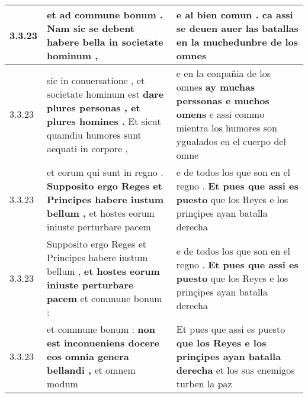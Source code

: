 \begin{tabular}{|p{1cm}|p{6.5cm}|p{6.5cm}|}
3.3.23 & et ad commune bonum . \textbf{ Nam sic se debent habere bella } in societate hominum , & e al bien comun . \textbf{ ca assi se deuen auer las batallas } en la muchedunbre de los omnes \\\hline
3.3.23 & sic in conuersatione , et societate hominum est \textbf{ dare plures personas , et plures homines . } Et sicut quamdiu humores sunt aequati in corpore , & e en la conpañia de los omnes \textbf{ ay muchas perssonas e muchos omens } e assi commo mientra los humores son ygualados en el cuerpo del omne \\\hline
3.3.23 & et eorum qui sunt in regno . \textbf{ Supposito ergo Reges et Principes habere iustum bellum , } et hostes eorum iniuste perturbare pacem & e de todos los que son en el regno . \textbf{ Et pues que assi es puesto } que los Reyes e los prinçipes ayan batalla derecha \\\hline
3.3.23 & Supposito ergo Reges et Principes habere iustum bellum , \textbf{ et hostes eorum iniuste perturbare pacem } et commune bonum : & e de todos los que son en el regno . \textbf{ Et pues que assi es puesto } que los Reyes e los prinçipes ayan batalla derecha \\\hline
3.3.23 & et commune bonum : \textbf{ non est inconueniens docere eos omnia genera bellandi , } et omnem modum & Et pues que assi es puesto \textbf{ que los Reyes e los prinçipes ayan batalla derecha } et los sus enemigos turben la paz \\\hline

\end{tabular}
